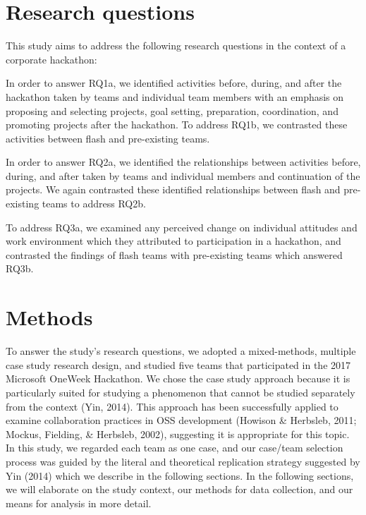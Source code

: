\documentclass{hcij}
\begin{document}
\section{Research questions}
This study aims to address the following research questions in the context of a corporate hackathon:

\vspace{0.25cm}
In order to answer RQ1a, we identified activities before, during, and after the hackathon taken by teams and individual team members with an emphasis on proposing and selecting projects, goal setting, preparation, coordination, and promoting projects after the hackathon. To address RQ1b, we contrasted these activities between flash and pre-existing teams.\par
{}
\vspace{0.25cm}
In order to answer RQ2a, we identified the relationships between activities before, during, and after taken by teams and individual members and continuation of the projects. We again contrasted these identified relationships between flash and pre-existing teams to address RQ2b.\par

\vspace{0.25cm}
To address RQ3a, we examined any perceived change on individual attitudes and work environment which they attributed to participation in a hackathon, and contrasted the findings of flash teams with pre-existing teams which answered RQ3b.

\section{Methods}
To answer the study’s research questions, we adopted a mixed-methods, multiple case study research design, and studied five teams that participated in the 2017 Microsoft OneWeek Hackathon. We chose the case study approach because it is particularly suited for studying a phenomenon that cannot be studied separately from the context (Yin, 2014). This approach has been successfully applied to examine collaboration practices in OSS development (Howison & Herbsleb, 2011; Mockus, Fielding, & Herbsleb, 2002), suggesting it is appropriate for this topic. In this study, we regarded each team as one case, and our case/team selection process was guided by the literal and theoretical replication strategy suggested by Yin (2014) which we describe in the following sections. In the following sections, we will elaborate on the study context, our methods for data collection, and our means for analysis in more detail.
\end{document}

